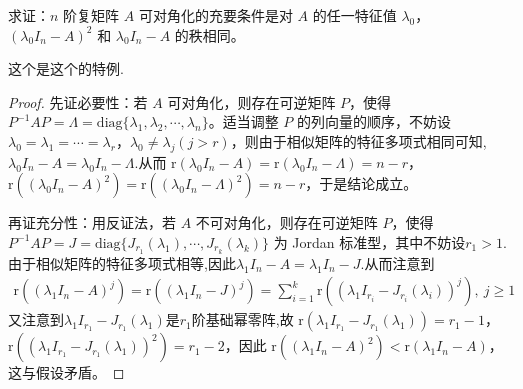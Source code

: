 \documentclass[../../main.tex]{subfiles}%
\begin{document}
\begin{proposition}\label{proposition:线性变换可对角化的代数充要条件2}
求证：$n$ 阶复矩阵 $A$ 可对角化的充要条件是对 $A$ 的任一特征值 $\lambda_0$，$(\lambda_0I_n - A)^2$ 和 $\lambda_0I_n - A$ 的秩相同。
\end{proposition}
\begin{remark}
这个是这个的特例.
\end{remark}
\begin{proof}

{\heiti 先证必要性：}若 $A$ 可对角化，则存在可逆矩阵 $P$，使得 $P^{-1}AP = \Lambda = \mathrm{diag}\{\lambda_1,\lambda_2,\cdots,\lambda_n\}$。适当调整 $P$ 的列向量的顺序，不妨设 $\lambda_0 = \lambda_1 = \cdots = \lambda_r$，$\lambda_0\neq\lambda_j (j > r)$，则由于相似矩阵的特征多项式相同可知,$\lambda_0I_n-A=\lambda_0I_n-\Lambda$.从而 $\mathrm{r}(\lambda_0I_n - A)=\mathrm{r}(\lambda_0I_n - \Lambda)=n - r$，$\mathrm{r}((\lambda_0I_n - A)^2)=\mathrm{r}((\lambda_0I_n - \Lambda)^2)=n - r$，于是结论成立。

{\heiti 再证充分性：}用反证法，若 $A$ 不可对角化，则存在可逆矩阵 $P$，使得 $P^{-1}AP = J = \mathrm{diag}\{J_{r_1}(\lambda_1),\cdots,J_{r_k}(\lambda_k)\}$ 为 Jordan 标准型，其中不妨设$r_1 > 1$.由于相似矩阵的特征多项式相等,因此$\lambda_1I_n-A=\lambda_1I_n-J$.从而注意到
\begin{align*}
\mathrm{r}((\lambda_1I_n - A)^j)=\mathrm{r}((\lambda_1I_n - J)^j)=\sum_{i = 1}^{k}\mathrm{r}((\lambda_1I_{r_i} - J_{r_i}(\lambda_i))^j),\ j\geqslant  1
\end{align*}
又注意到$\lambda_1I_{r_1}-J_{r_1}(\lambda_1)$是$r_1$阶基础幂零阵,故
$\mathrm{r}(\lambda_1I_{r_1} - J_{r_1}(\lambda_1))=r_1 - 1$，$\mathrm{r}((\lambda_1I_{r_1} - J_{r_1}(\lambda_1))^2)=r_1 - 2$，因此 $\mathrm{r}((\lambda_1I_n - A)^2)<\mathrm{r}(\lambda_1I_n - A)$，这与假设矛盾。
\end{proof}
\end{document}
